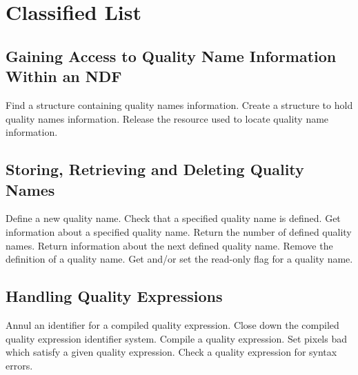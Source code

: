 \section {Classified List}

\subsection{Gaining Access to Quality Name Information Within an NDF}
   {Find a structure containing quality names information.}
   {Create a structure to hold quality names information.}
   {Release the resource used to locate quality name information.}

\subsection{Storing, Retrieving and Deleting Quality Names}
   {Define a new quality name.}
   {Check that a specified quality name is defined.}
   {Get information about a specified quality name.}
   {Return the number of defined quality names.}
   {Return information about the next defined quality name.}
   {Remove the definition of a quality name.}
   {Get and/or set the read-only flag for a quality name.}

\subsection{Handling Quality Expressions}
   {Annul an identifier for a compiled quality expression.}
   {Close down the compiled quality expression identifier system.}
   {Compile a quality expression.}
   {Set pixels bad which satisfy a given quality expression.}
   {Check a quality expression for syntax errors.}

